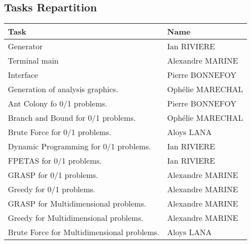 \documentclass[a4paper, 11pt]{article}
\begin{document}
    \subsection{Tasks Repartition}
    \begin{center}
        \begin{tabular}{|p{4cm}|p{2cm}|}
            \hline
            \textbf{Task} & \textbf{Name} \\
            \hline
            Generator & Ian RIVIERE\\
            \hline
            Terminal main & Alexandre MARINE\\
            \hline
            Interface & Pierre BONNEFOY \\
            \hline
            Generation of analysis graphics. & Ophélie MARECHAL \\
            \hline
            Ant Colony fo 0/1 problems. & Pierre BONNEFOY \\
            \hline
            Branch and Bound for 0/1 problems. & Ophélie MARECHAL \\
            \hline
            Brute Force for 0/1 problems.  & Aloys LANA \\
            \hline
            Dynamic Programming for 0/1 problems. & Ian RIVIERE \\
            \hline 
            FPETAS for 0/1 problems. & Ian RIVIERE \\
            \hline
            GRASP for 0/1 problems.  & Alexandre MARINE \\
            \hline
            Greedy for 0/1 problems.  & Alexandre MARINE \\
            \hline
            GRASP for Multidimensional problems.  & Alexandre MARINE \\
            \hline
            Greedy for Multidimensional problems.  & Alexandre MARINE \\
            \hline
            Brute Force for Multidimensional problems.  & Aloys LANA \\
            \hline
        \end{tabular}
    \end{center}

    \newpage
\end{document}

